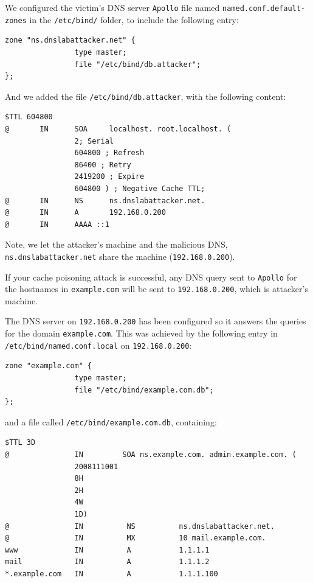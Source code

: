 We configured the victim's DNS server {\tt Apollo}
file named {\tt named.conf.default-zones} in
the {\tt /etc/bind/} folder, to include the following entry:

\begin{verbatim}
zone "ns.dnslabattacker.net" {
                type master;
                file "/etc/bind/db.attacker";
};
\end{verbatim}

And we added the file {\tt /etc/bind/db.attacker}, with the following
content:

\begin{verbatim}
$TTL 604800
@		IN		SOA		localhost. root.localhost. (
                2; Serial
                604800 ; Refresh
                86400 ; Retry
                2419200 ; Expire
                604800 ) ; Negative Cache TTL;
@		IN		NS		ns.dnslabattacker.net.
@		IN		A		192.168.0.200
@		IN		AAAA ::1
\end{verbatim}
\noindent Note, we let the attacker's machine and the malicious DNS, 
{\tt ns.dnslabattacker.net} share the machine ({\tt 192.168.0.200}). 

If your cache poisoning attack is successful, any 
DNS query sent to {\tt Apollo} for the hostnames 
in {\tt example.com} will be sent to {\tt 192.168.0.200}, which is 
attacker's machine. 


The DNS server on {\tt 192.168.0.200} has been configured so it answers the 
queries for the domain {\tt example.com}.  This was achieved by
the following 
entry in {\tt /etc/bind/named.conf.local} on {\tt 192.168.0.200}:

\begin{verbatim}
zone "example.com" {
                type master;
                file "/etc/bind/example.com.db";
};
\end{verbatim}

\noindent and a file called {\tt /etc/bind/example.com.db}, containing:

\begin{verbatim}
$TTL 3D
@               IN         SOA ns.example.com. admin.example.com. (
                2008111001
                8H
                2H
                4W
                1D)	
@               IN          NS          ns.dnslabattacker.net.
@               IN          MX          10 mail.example.com.
www             IN          A           1.1.1.1	
mail            IN          A           1.1.1.2
*.example.com   IN          A           1.1.1.100
\end{verbatim}

